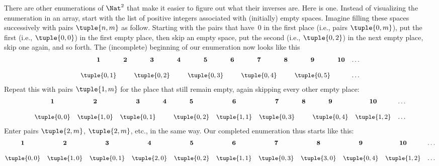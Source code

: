 \documentclass[../../../include/open-logic-section]{subfiles}
\begin{document}


\begin{explain}
There are other enumerations of $\Nat^2$ that make it easier to
figure out what their inverses are. Here is one. Instead of
visualizing the enumeration in an array, start with the list of
positive integers associated with (initially) empty spaces. Imagine
filling these spaces successively with pairs $\tuple{n,m}$ as follow.
Starting with the pairs that have~$0$ in  the first place (i.e., pairs
$\tuple{0,m}$), put the first (i.e., $\tuple{0,0}$) in the first empty
place, then skip an empty space, put the second (i.e., $\tuple{0,2}$)
in the next empty place, skip one again, and so forth. The
(incomplete) beginning of our enumeration now looks like this
\[\small
\begin{array}{@{}c c c c c c c c c c c@{}}
\mathbf 1 & \mathbf 2 & \mathbf 3 & \mathbf 4 & \mathbf 5 & \mathbf 6 & \mathbf 7 & \mathbf 8 & \mathbf 9 & \mathbf{10} & \dots \\ \\
\tuple{0,1} &  & \tuple{0,2} &  & \tuple{0,3} & & \tuple{0,4} &  & \tuple{0,5} &  & \dots \\
\end{array}
\]
Repeat this with pairs $\tuple{1,m}$ for the place that still remain
empty, again skipping every other empty place:
\[\small
\begin{array}{@{}c c c c c c c c c c c@{}}
\mathbf 1 & \mathbf 2 & \mathbf 3 & \mathbf 4 & \mathbf 5 & \mathbf 6 & \mathbf 7 & \mathbf 8 & \mathbf 9 & \mathbf{10} & \dots \\ \\
\tuple{0,0} & \tuple{1,0} & \tuple{0,1} &  & \tuple{0,2} & \tuple{1,1} & 
\tuple{0,3} & & \tuple{0,4} &  \tuple{1,2} & \dots \\
\end{array}
\]
Enter pairs $\tuple{2,m}$, $\tuple{2,m}$, etc., in the same way. Our
completed enumeration thus starts like this:
\[\small
\begin{array}{@{}cc c c c c c c c c c@{}}
\mathbf 1 & \mathbf 2 & \mathbf 3 & \mathbf 4 & \mathbf 5 & \mathbf 6 & \mathbf 7 & \mathbf 8 & \mathbf 9 & \mathbf{10} & \dots \\ \\
\tuple{0,0} & \tuple{1,0} & \tuple{0,1} & \tuple{2,0}  & \tuple{0,2} & 
\tuple{1,1} & \tuple{0,3} & \tuple{3,0}  & \tuple{0,4} &  \tuple{1,2} & \dots \\

\end{array}\]
\end{explain}
\end{document}
